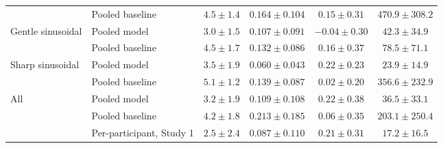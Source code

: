 \begin{table}[t]
\begin{tabular}{l l cccc}
                           & Pooled baseline            & $4.5 \pm 1.4$ & $0.164 \pm 0.104$ & $0.15 \pm 0.31$ & $470.9 \pm 308.2$ \\
        Gentle sinusoidal  & Pooled model               & $3.0 \pm 1.5$ & $0.107 \pm 0.091$ & $-0.04 \pm 0.30$ & $42.3 \pm 34.9$ \\
                           & Pooled baseline            & $4.5 \pm 1.7$ & $0.132 \pm 0.086$ & $0.16 \pm 0.37$ & $78.5 \pm 71.1$ \\
        Sharp sinusoidal   & Pooled model               & $3.5 \pm 1.9$ & $0.060 \pm 0.043$ & $0.22 \pm 0.23$ & $23.9 \pm 14.9$ \\
                           & Pooled baseline            & $5.1 \pm 1.2$ & $0.139 \pm 0.087$ & $0.02 \pm 0.20$ & $356.6 \pm 232.9$ \\
        \midrule
        All                & Pooled model               & $3.2 \pm 1.9$ & $0.109 \pm 0.108$ & $0.22 \pm 0.38$ & $36.5 \pm 33.1$ \\
                           & Pooled baseline            & $4.2 \pm 1.8$ & $0.213 \pm 0.185$ & $0.06 \pm 0.35$ & $203.1 \pm 250.4$ \\
                           & Per-participant, Study 1   & $2.5 \pm 2.4$ & $0.087 \pm 0.110$ & $0.21 \pm 0.31$ & $17.2 \pm 16.5$ \\
        \bottomrule
    \end{tabular}
\end{table}

